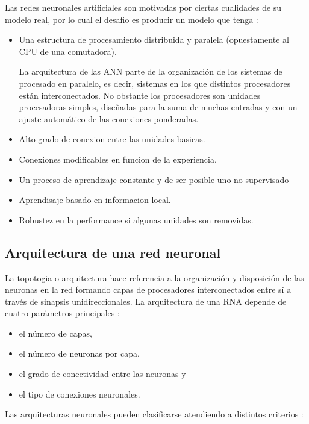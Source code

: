 Las redes neuronales artificiales son motivadas por ciertas cualidades de su modelo real, por lo cual el
desafio es producir un modelo que tenga \cite{nacelle2009redes}:
\begin{itemize}
\item  Una estructura de procesamiento distribuida y paralela (opuestamente al CPU de una comutadora).

La arquitectura de las ANN parte de la organización de los sistemas de procesado en paralelo, es decir, sistemas en los que distintos procesadores están interconectados. No
obstante los procesadores son unidades procesadoras simples, diseñadas para la suma de muchas entradas y con un ajuste automático de las conexiones ponderadas. 
\item Alto grado de conexion entre las unidades basicas.
\item Conexiones modificables en funcion de la experiencia.
\item Un proceso de aprendizaje constante y de ser posible uno no supervisado
\item Aprendisaje basado en informacion local.
\item Robustez en la performance si algunas unidades son removidas.

\end{itemize}

\subsection{Arquitectura de una red neuronal}
La topotogia o arquitectura hace referencia a la organización y disposición de las neuronas en la red formando capas de procesadores interconectados entre sí a través de sinapsis unidireccionales. La arquitectura de una RNA depende de cuatro parámetros principales \cite{lopez2008redes}: 

\begin{itemize}
\item el número de capas,
\item el número de neuronas por capa,
\item el grado de conectividad entre las neuronas y 
\item el tipo de conexiones neuronales. 
\end{itemize}


\vspace{1\baselineskip}
Las arquitecturas neuronales pueden clasificarse atendiendo a distintos criterios \cite{lopez2008redes}:

